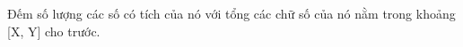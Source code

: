 Đếm số lượng các số có tích của nó với tổng các chữ số của nó nằm trong khoảng [X, Y] cho trước.  

\